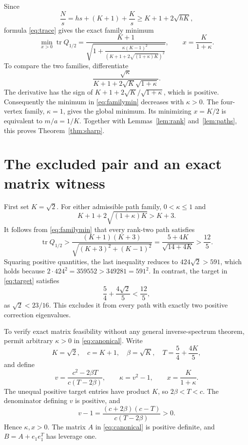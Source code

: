 \documentclass[11pt]{article}
\newcommand{\tr}{\operatorname{tr}}
\begin{document}
Since
\[
 \frac Ns=hs+(K+1)+\frac Ks\ge K+1+2\sqrt{hK},
\]
formula \eqref{eq:trace} gives the exact family minimum
\begin{equation}\label{eq:familymin}
 \min_{x>0}\tr Q_{1/2}
 =\frac{K+1}{\displaystyle\sqrt{1+
   \frac{\kappa(K-1)^2}
        {(K+1+2\sqrt{(1+\kappa)K})^2}}},
 \qquad x=\frac K{1+\kappa}.
\end{equation}
To compare the two families, differentiate
\[
 \frac{\sqrt\kappa}{K+1+2\sqrt K\sqrt{1+\kappa}}.
\]
The derivative has the sign of
$K+1+2\sqrt K/\sqrt{1+\kappa}$, which is positive. Consequently
the minimum in \eqref{eq:familymin} decreases with $\kappa>0$.
The four-vertex family, $\kappa=1$, gives the global minimum.
Its minimizing $x=K/2$ is equivalent to $m/a=1/K$.
Together with Lemmas~\ref{lem:rank} and~\ref{lem:paths}, this proves
Theorem~\ref{thm:sharp}.

\section{The excluded pair and an exact matrix witness}

First set $K=\sqrt2$. For either admissible path family,
$0<\kappa\le1$ and
\[
 K+1+2\sqrt{(1+\kappa)K}>K+3.
\]
It follows from \eqref{eq:familymin} that every rank-two path satisfies
\begin{equation}\label{eq:rationalgap}
 \tr Q_{1/2}>
 \frac{(K+1)(K+3)}{\sqrt{(K+3)^2+(K-1)^2}}
 =\frac{5+4K}{\sqrt{14+4K}}>\frac{12}5.
\end{equation}
Squaring positive quantities, the last inequality reduces to
$424\sqrt2>591$, which holds because
$2\cdot424^2=359552>349281=591^2$.
In contrast, the target in \eqref{eq:target} satisfies
\[
 \frac54+\frac{4\sqrt2}5<\frac{12}5,
\]
as $\sqrt2<23/16$. This excludes it from every path with exactly
two positive correction eigenvalues.

To verify exact matrix feasibility without any general inverse-spectrum
theorem, permit arbitrary $\kappa>0$ in \eqref{eq:canonical}.
Write
\[
 K=\sqrt2,\quad c=K+1,\quad \beta=\sqrt K,
 \quad T=\frac54+\frac{4K}5,
\]
and define
\begin{equation}\label{eq:witness}
 v=\frac{c^2-2\beta T}{c(T-2\beta)},\qquad
 \kappa=v^2-1,\qquad x=\frac K{1+\kappa}.
\end{equation}
The unequal positive target entries have product $K$, so
$2\beta<T<c$. The denominator defining $v$ is positive, and
\[
 v-1=\frac{(c+2\beta)(c-T)}{c(T-2\beta)}>0.
\]
Hence $\kappa,x>0$. The matrix $A$ in \eqref{eq:canonical} is
positive definite, and $B=A+e_1e_1^T$ has leverage one.
\end{document}
